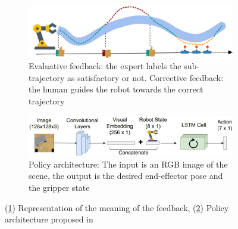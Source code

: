 \begin{figure}[htb]
    \begin{subfigure}{0.45\textwidth}
         \includegraphics[width=\textwidth]{Figures/images/correct-me-if-i-am-wrong/feedback.jpg}
         \caption{Evaluative feedback: the expert labels the sub-trajectory as satisfactory or not. Corrective feedback: the human guides the robot towards the correct trajectory}
         \label{fig:feedback}
    \end{subfigure}
    \hfill
    \begin{subfigure}{0.50\textwidth}
         \includegraphics[width=\textwidth]{Figures/images/correct-me-if-i-am-wrong/correct_me_architecture.jpg}
         \caption{Policy architecture: The input is an RGB image of the scene, the output is the desired end-effector pose and the gripper state}
         \vspace{0.5cm}
         \label{fig:architecture}
    \end{subfigure}
    \caption{(\ref{fig:feedback}) Representation of the meaning of the feedback, (\ref{fig:architecture}) Policy architecture proposed in \cite{chisari2022correct}}
    \label{fig:correct_me_if_im_wrong}
\end{figure}
